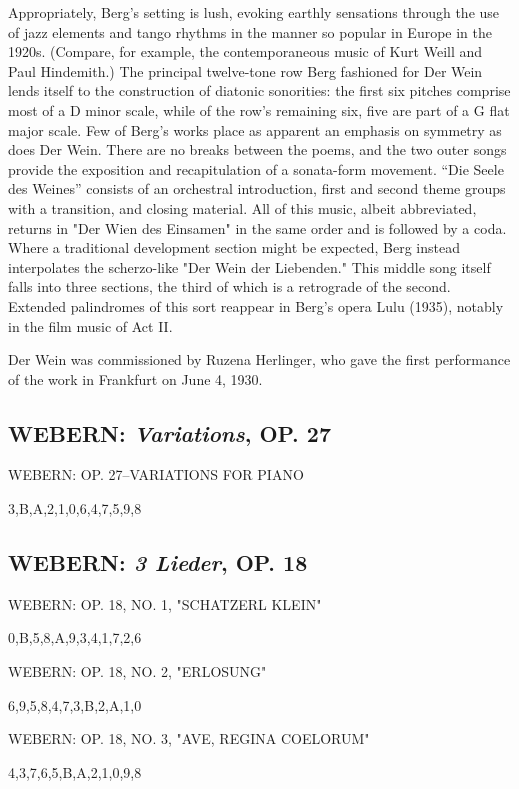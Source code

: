         Appropriately, Berg's setting is lush, evoking earthly sensations through the use of jazz elements and tango rhythms in the manner so popular in Europe in the 1920s. (Compare, for example, the contemporaneous music of Kurt Weill and Paul Hindemith.) The principal twelve-tone row Berg fashioned for Der Wein lends itself to the construction of diatonic sonorities: the first six pitches comprise most of a D minor scale, while of the row's remaining six, five are part of a G flat major scale. Few of Berg's works place as apparent an emphasis on symmetry as does Der Wein. There are no breaks between the poems, and the two outer songs provide the exposition and recapitulation of a sonata-form movement. ``Die Seele des Weines'' consists of an orchestral introduction, first and second theme groups with a transition, and closing material. All of this music, albeit abbreviated, returns in "Der Wien des Einsamen" in the same order and is followed by a coda. Where a traditional development section might be expected, Berg instead interpolates the scherzo-like "Der Wein der Liebenden." This middle song itself falls into three sections, the third of which is a retrograde of the second. Extended palindromes of this sort reappear in Berg's opera Lulu (1935), notably in the film music of Act II.
        
        Der Wein was commissioned by Ruzena Herlinger, who gave the first performance of the work in Frankfurt on June 4, 1930.
        
        \subsection{WEBERN: \textit{Variations}, OP. 27}     
        
        WEBERN: OP. 27--VARIATIONS FOR PIANO
        
        {3,B,A,2,1,0,6,4,7,5,9,8}
        
        \subsection{WEBERN: \textit{3 Lieder}, OP. 18}
        
        WEBERN: OP. 18, NO. 1, "SCHATZERL KLEIN"
        
        {0,B,5,8,A,9,3,4,1,7,2,6}
        
        WEBERN: OP. 18, NO. 2, "ERLOSUNG"
        
        {6,9,5,8,4,7,3,B,2,A,1,0}
        
        WEBERN: OP. 18, NO. 3, "AVE, REGINA COELORUM"
        
        {4,3,7,6,5,B,A,2,1,0,9,8}
